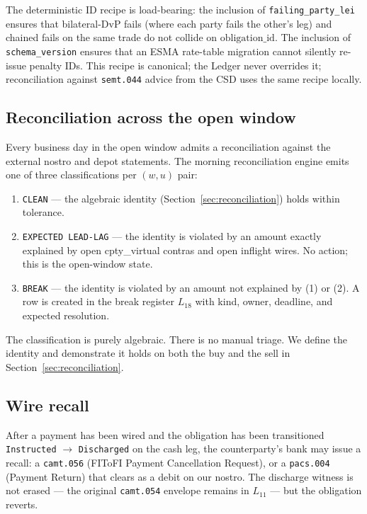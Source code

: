 \documentclass[11pt,a4paper]{article}
\begin{document}
The deterministic ID recipe is load-bearing: the inclusion of \texttt{failing\_party\_lei} ensures that bilateral-DvP fails (where each party fails the other's leg) and chained fails on the same trade do not collide on $\mathrm{obligation\_id}$. The inclusion of \texttt{schema\_version} ensures that an ESMA rate-table migration cannot silently re-issue penalty IDs. This recipe is canonical; the Ledger never overrides it; reconciliation against \texttt{semt.044} advice from the CSD uses the same recipe locally.

\subsection{Reconciliation across the open window}
\label{sec:variant-recon-across-window}

Every business day in the open window admits a reconciliation against the external nostro and depot statements. The morning reconciliation engine emits one of three classifications per $(w, u)$ pair:

\begin{enumerate}[nosep]
\item \texttt{CLEAN} --- the algebraic identity (Section~\ref{sec:reconciliation}) holds within tolerance.
\item \texttt{EXPECTED LEAD-LAG} --- the identity is violated by an amount exactly explained by open cpty\_virtual contras and open inflight wires. No action; this is the open-window state.
\item \texttt{BREAK} --- the identity is violated by an amount not explained by (1) or (2). A row is created in the break register $L_{18}$ with kind, owner, deadline, and expected resolution.
\end{enumerate}

The classification is purely algebraic. There is no manual triage. We define the identity and demonstrate it holds on both the buy and the sell in Section~\ref{sec:reconciliation}.

\subsection{Wire recall}
\label{sec:variant-wire-recall}

After a payment has been wired and the obligation has been transitioned \texttt{Instructed} $\to$ \texttt{Discharged} on the cash leg, the counterparty's bank may issue a recall: a \texttt{camt.056} (FIToFI Payment Cancellation Request), or a \texttt{pacs.004} (Payment Return) that clears as a debit on our nostro. The discharge witness is not erased --- the original \texttt{camt.054} envelope remains in $L_{11}$ --- but the obligation reverts.
\end{document}
